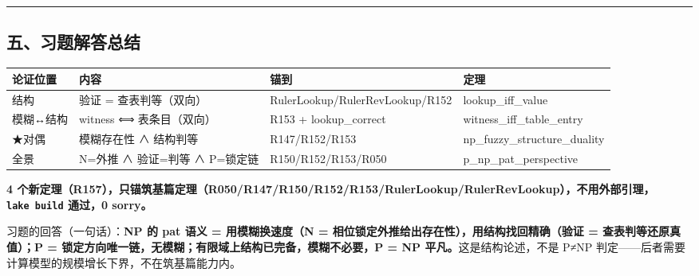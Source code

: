 \documentclass[
]{article}
\newcounter{none} %
\begin{document}
\begin{center}\rule{0.5\linewidth}{0.5pt}\end{center}

\subsection{五、习题解答总结}\label{ux4e94ux4e60ux9898ux89e3ux7b54ux603bux7ed3}

{\def\LTcaptype{none} %
\begin{longtable}[]{@{}
  >{\raggedright\arraybackslash}p{}
  >{\raggedright\arraybackslash}p{}
  >{\raggedright\arraybackslash}p{}
  >{\raggedright\arraybackslash}p{}@{}}
\toprule\noalign{}
\begin{minipage}[b]{\linewidth}\raggedright
论证位置
\end{minipage} & \begin{minipage}[b]{\linewidth}\raggedright
内容
\end{minipage} & \begin{minipage}[b]{\linewidth}\raggedright
锚到
\end{minipage} & \begin{minipage}[b]{\linewidth}\raggedright
定理
\end{minipage} \\
\midrule\noalign{}
\endhead
\bottomrule\noalign{}
\endlastfoot
结构 & 验证 = 查表判等（双向） & RulerLookup/RulerRevLookup/R152 &
lookup\_iff\_value \\
模糊↔结构 & witness ⟺ 表条目（双向） & R153 + lookup\_correct &
witness\_iff\_table\_entry \\
★对偶 & 模糊存在性 ∧ 结构判等 & R147/R152/R153 &
np\_fuzzy\_structure\_duality \\
全景 & N=外推 ∧ 验证=判等 ∧ P=锁定链 & R150/R152/R153/R050 &
p\_np\_pat\_perspective \\
\end{longtable}
}

\textbf{4
个新定理（R157），只锚筑基篇定理（R050/R147/R150/R152/R153/RulerLookup/RulerRevLookup），不用外部引理，\texttt{lake\ build}
通过，0 sorry。}

习题的回答（一句话）：\textbf{NP 的 pat 语义 = 用模糊换速度（N =
相位锁定外推给出存在性），用结构找回精确（验证 = 查表判等还原真值）；P =
锁定方向唯一链，无模糊；有限域上结构已完备，模糊不必要，P = NP
平凡。}这是结构论述，不是 P≠NP
判定------后者需要计算模型的规模增长下界，不在筑基篇能力内。
\end{document}
